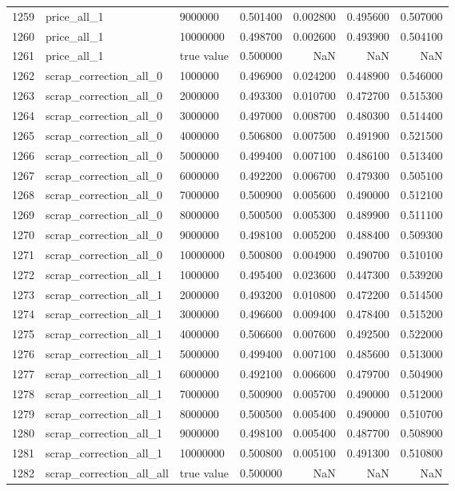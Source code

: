 \begin{tabular}{lllrrrr}
1259 & price_all_1 & 9000000 & 0.501400 & 0.002800 & 0.495600 & 0.507000 \\
1260 & price_all_1 & 10000000 & 0.498700 & 0.002600 & 0.493900 & 0.504100 \\
1261 & price_all_1 & true value & 0.500000 & NaN & NaN & NaN \\
1262 & scrap_correction_all_0 & 1000000 & 0.496900 & 0.024200 & 0.448900 & 0.546000 \\
1263 & scrap_correction_all_0 & 2000000 & 0.493300 & 0.010700 & 0.472700 & 0.515300 \\
1264 & scrap_correction_all_0 & 3000000 & 0.497000 & 0.008700 & 0.480300 & 0.514400 \\
1265 & scrap_correction_all_0 & 4000000 & 0.506800 & 0.007500 & 0.491900 & 0.521500 \\
1266 & scrap_correction_all_0 & 5000000 & 0.499400 & 0.007100 & 0.486100 & 0.513400 \\
1267 & scrap_correction_all_0 & 6000000 & 0.492200 & 0.006700 & 0.479300 & 0.505100 \\
1268 & scrap_correction_all_0 & 7000000 & 0.500900 & 0.005600 & 0.490000 & 0.512100 \\
1269 & scrap_correction_all_0 & 8000000 & 0.500500 & 0.005300 & 0.489900 & 0.511100 \\
1270 & scrap_correction_all_0 & 9000000 & 0.498100 & 0.005200 & 0.488400 & 0.509300 \\
1271 & scrap_correction_all_0 & 10000000 & 0.500800 & 0.004900 & 0.490700 & 0.510100 \\
1272 & scrap_correction_all_1 & 1000000 & 0.495400 & 0.023600 & 0.447300 & 0.539200 \\
1273 & scrap_correction_all_1 & 2000000 & 0.493200 & 0.010800 & 0.472200 & 0.514500 \\
1274 & scrap_correction_all_1 & 3000000 & 0.496600 & 0.009400 & 0.478400 & 0.515200 \\
1275 & scrap_correction_all_1 & 4000000 & 0.506600 & 0.007600 & 0.492500 & 0.522000 \\
1276 & scrap_correction_all_1 & 5000000 & 0.499400 & 0.007100 & 0.485600 & 0.513000 \\
1277 & scrap_correction_all_1 & 6000000 & 0.492100 & 0.006600 & 0.479700 & 0.504900 \\
1278 & scrap_correction_all_1 & 7000000 & 0.500900 & 0.005700 & 0.490000 & 0.512000 \\
1279 & scrap_correction_all_1 & 8000000 & 0.500500 & 0.005400 & 0.490000 & 0.510700 \\
1280 & scrap_correction_all_1 & 9000000 & 0.498100 & 0.005400 & 0.487700 & 0.508900 \\
1281 & scrap_correction_all_1 & 10000000 & 0.500800 & 0.005100 & 0.491300 & 0.510800 \\
1282 & scrap_correction_all_all & true value & 0.500000 & NaN & NaN & NaN \\
\bottomrule
\end{tabular}
